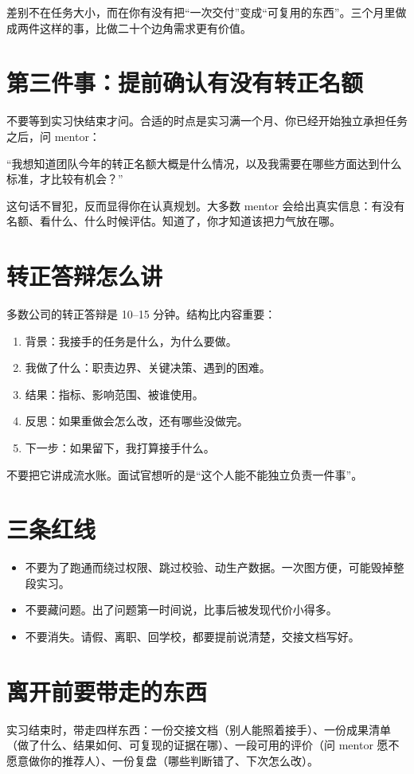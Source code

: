 \documentclass[UTF8,zihao=5,openany]{ctexbook}
\begin{document}
差别不在任务大小，而在你有没有把“一次交付”变成“可复用的东西”。三个月里做成两件这样的事，比做二十个边角需求更有价值。

\section{第三件事：提前确认有没有转正名额}
不要等到实习快结束才问。合适的时点是实习满一个月、你已经开始独立承担任务之后，问 mentor：

“我想知道团队今年的转正名额大概是什么情况，以及我需要在哪些方面达到什么标准，才比较有机会？”

这句话不冒犯，反而显得你在认真规划。大多数 mentor 会给出真实信息：有没有名额、看什么、什么时候评估。知道了，你才知道该把力气放在哪。

\section{转正答辩怎么讲}
多数公司的转正答辩是 10--15 分钟。结构比内容重要：

\begin{enumerate}
\item 背景：我接手的任务是什么，为什么要做。
\item 我做了什么：职责边界、关键决策、遇到的困难。
\item 结果：指标、影响范围、被谁使用。
\item 反思：如果重做会怎么改，还有哪些没做完。
\item 下一步：如果留下，我打算接手什么。
\end{enumerate}

不要把它讲成流水账。面试官想听的是“这个人能不能独立负责一件事”。

\section{三条红线}
\begin{itemize}
\item 不要为了跑通而绕过权限、跳过校验、动生产数据。一次图方便，可能毁掉整段实习。
\item 不要藏问题。出了问题第一时间说，比事后被发现代价小得多。
\item 不要消失。请假、离职、回学校，都要提前说清楚，交接文档写好。
\end{itemize}

\section{离开前要带走的东西}
实习结束时，带走四样东西：一份交接文档（别人能照着接手）、一份成果清单（做了什么、结果如何、可复现的证据在哪）、一段可用的评价（问 mentor 愿不愿意做你的推荐人）、一份复盘（哪些判断错了、下次怎么改）。
\end{document}
